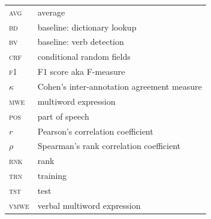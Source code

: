 \documentclass[output=paper
,modfonts
,nonflat,draftmode]{langsci/langscibook}
\begin{document}
\begin{tabularx}{.48\textwidth}{ll}
\textsc{avg} & average \\
\textsc{bd} & baseline: dictionary lookup \\
\textsc{bv} & baseline: verb detection \\
\textsc{crf} & conditional random fields \\
\textsc{f1} & F1 score aka F-measure \\
\textsc{$\kappa$} & Cohen's inter-annotation agreement measure \\
\textsc{mwe} & multiword expression \\
\textsc{pos} & part of speech \\
\textsc{$r$} & Pearson's correlation coefficient \\
\textsc{$\rho$} & Spearman's rank correlation coefficient \\
\textsc{rnk} & rank \\
\textsc{trn} & training \\
\textsc{tst} & test \\
\textsc{vmwe} & verbal multiword expression \\
\end{tabularx}

{\sloppy
\printbibliography[heading=subbibliography,notkeyword=this]
}
\end{document}
